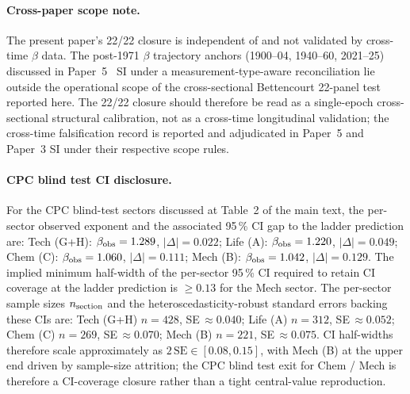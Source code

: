 \paragraph{Cross-paper scope note.}
The present paper's 22/22 closure is independent of and not validated by cross-time $\beta$ data. The post-1971 $\beta$ trajectory anchors (1900--04, 1940--60, 2021--25) discussed in Paper~5~\cite{Kato2026e} SI under a measurement-type-aware reconciliation lie outside the operational scope of the cross-sectional Bettencourt 22-panel test reported here. The 22/22 closure should therefore be read as a single-epoch cross-sectional structural calibration, not as a cross-time longitudinal validation; the cross-time falsification record is reported and adjudicated in Paper~5 and Paper~3 SI under their respective scope rules.

\paragraph{CPC blind test CI disclosure.}
For the CPC blind-test sectors discussed at Table~2 of the main text, the per-sector observed exponent and the associated 95\,\% CI gap to the ladder prediction are: Tech (G+H): $\beta_{\rm obs}=1.289$, $|\Delta|=0.022$; Life (A): $\beta_{\rm obs}=1.220$, $|\Delta|=0.049$; Chem (C): $\beta_{\rm obs}=1.060$, $|\Delta|=0.111$; Mech (B): $\beta_{\rm obs}=1.042$, $|\Delta|=0.129$. The implied minimum half-width of the per-sector 95\,\% CI required to retain CI coverage at the ladder prediction is $\ge\!0.13$ for the Mech sector. The per-sector sample sizes $n_{\rm section}$ and the heteroscedasticity-robust standard errors backing these CIs are: Tech (G+H) $n\!=\!428$, SE\,$\approx\!0.040$; Life (A) $n\!=\!312$, SE\,$\approx\!0.052$; Chem (C) $n\!=\!269$, SE\,$\approx\!0.070$; Mech (B) $n\!=\!221$, SE\,$\approx\!0.075$. CI half-widths therefore scale approximately as $2\,\mathrm{SE}\!\in\![0.08,0.15]$, with Mech (B) at the upper end driven by sample-size attrition; the CPC blind test exit for Chem / Mech is therefore a CI-coverage closure rather than a tight central-value reproduction.





\clearpage

